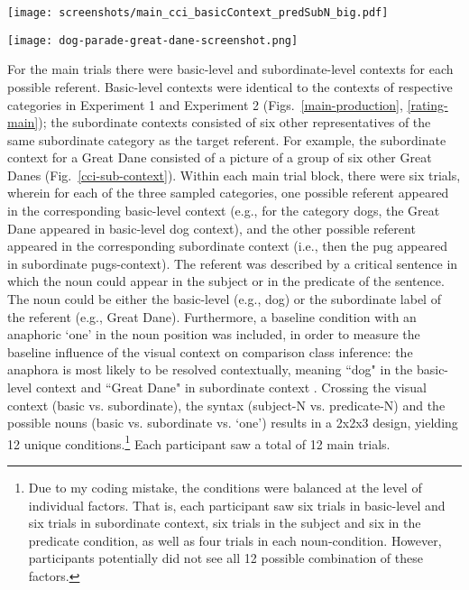 \begin{figure*}[t]
	\begin{center}
		\texttt{[image: screenshots/main\_cci\_basicContext\_predSubN\_big.pdf]}
	\end{center}
	\vspace{-0.5cm}
	\caption{Example view of a comparison class inference main trial: Participants paraphrased the critical utterance with a subordinate noun in predicate position, which appeared in basic-level context, describing a large-subordinate target.}
	\label{main-cci}
\end{figure*}
\begin{figure*}[h]
	\begin{center}
		\texttt{[image: dog-parade-great-dane-screenshot.png]}
	\end{center}
	\caption{Example view of a subordinate context: For the category Great Danes, the context depicts six different Great Danes.}
	\label{cci-sub-context}
\end{figure*}
For the main trials there were basic-level and subordinate-level contexts for each possible referent. Basic-level contexts were identical to the contexts of respective categories in Experiment 1 and Experiment 2 (Figs.~\ref{main-production}, \ref{rating-main}); the subordinate contexts consisted of six other representatives of the same subordinate category as the target referent. For example, the subordinate context for a Great Dane consisted of a picture of a group of six other Great Danes (Fig.~\ref{cci-sub-context}). Within each main trial block, there were six trials, wherein for each of the three sampled categories, one possible referent appeared in the corresponding basic-level context (e.g., for the category dogs, the Great Dane appeared in basic-level dog context), and the other possible referent appeared in the corresponding subordinate context (i.e., then the pug appeared in subordinate pugs-context). 
The referent was described by a critical sentence in which the noun could appear in the subject or in the predicate of the sentence. The noun could be either the basic-level (e.g., dog) or the subordinate label of the referent (e.g., Great Dane). Furthermore, a baseline condition with an anaphoric ‘one’ in the noun position was included, in order to measure the baseline influence of the visual context on comparison class inference: the anaphora is most likely to be resolved contextually, meaning ``dog" in the basic-level context and ``Great Dane" in subordinate context \parencite{goldberg2017one}. Crossing the visual context (basic vs. subordinate), the syntax (subject-N vs. predicate-N) and the possible nouns (basic vs. subordinate vs. ‘one’) results in a 2x2x3 design, yielding 12 unique conditions.\footnote{Due to my coding mistake, the conditions were balanced at the level of individual factors. That is, each participant saw six trials in basic-level and six trials in subordinate context, six trials in the subject and six in the predicate condition, as well as four trials in each noun-condition. However, participants potentially did not see all 12 possible combination of these factors.}
Each participant saw a total of 12 main trials.   

